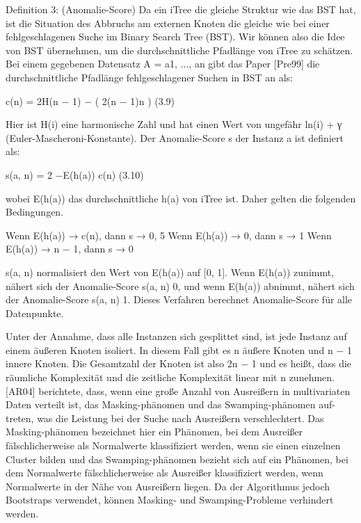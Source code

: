 Definition 3: (Anomalie-Score)
Da ein iTree die gleiche Struktur wie das BST hat, ist die Situation des Abbruchs am externen Knoten die gleiche wie bei einer fehlgeschlagenen Suche im Binary Search Tree (BST). Wir können also die Idee von BST übernehmen, um die durchschnittliche Pfadlänge von iTree zu schätzen. Bei einem gegebenen Datensatz A = {a1, ..., an} gibt das Paper [Pre99] die durchschnittliche Pfadlänge fehlgeschlagener Suchen in BST an als:

c(n) = 2H(n − 1) − ( 2(n − 1)n ) (3.9)

Hier ist H(i) eine harmonische Zahl und hat einen Wert von ungefähr ln(i) + γ (Euler-Mascheroni-Konstante). Der Anomalie-Score s der Instanz a ist definiert als:

s(a, n) = 2 −E(h(a)) c(n) (3.10)

wobei E(h(a)) das durchschnittliche h(a) von iTree ist. Daher gelten die folgenden Bedingungen.

Wenn E(h(a)) → c(n), dann s → 0, 5
Wenn E(h(a)) → 0, dann s → 1
Wenn E(h(a)) → n − 1, dann s → 0

s(a, n) normalisiert den Wert von E(h(a)) auf [0, 1]. Wenn E(h(a)) zunimmt, nähert sich der Anomalie-Score s(a, n) 0, und wenn E(h(a)) abnimmt, nähert sich der Anomalie-Score s(a, n) 1. Dieses Verfahren berechnet Anomalie-Score für alle Datenpunkte.

Unter der Annahme, dass alle Instanzen sich gesplittet sind, ist jede Instanz auf einem äußeren Knoten isoliert. In diesem Fall gibt es n äußere Knoten und n − 1 innere Knoten. Die Gesamtzahl der Knoten ist also 2n − 1 und es heißt, dass die räumliche Komplexität und die zeitliche Komplexität linear mit n zunehmen. [AR04] berichtete, dass, wenn eine große Anzahl von Ausreißern in multivariaten Daten verteilt ist, das Masking-phänomen und das Swamping-phänomen auf- treten, was die Leistung bei der Suche nach Ausreißern verschlechtert. Das Masking-phänomen bezeichnet hier ein Phänomen, bei dem Ausreißer fälschlicherweise als Normalwerte klassifiziert werden, wenn sie einen einzelnen Cluster bilden und das Swamping-phänomen bezieht sich auf ein Phänomen, bei dem Normalwerte fälschlicherweise als Ausreißer klassifiziert werden, wenn Normalwerte in der Nähe von Ausreißern liegen. Da der Algorithmus jedoch Bootstraps verwendet, können Masking- und Swamping-Probleme verhindert werden.